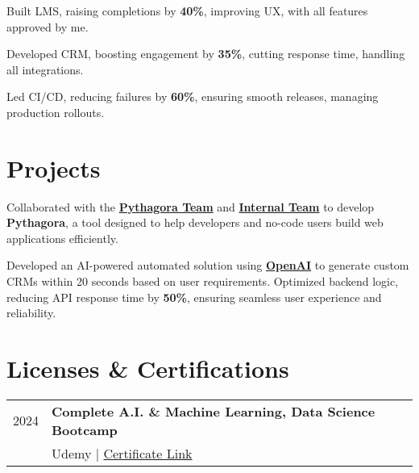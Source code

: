 \documentclass[]{deedy-resume-openfont}
\begin{document}
\begin{minipage}[t]{0.66\textwidth}
    \begin{tightemize}  
        \item Built LMS, raising completions by \textbf{40\%}, improving UX, with all features approved by me.  
        \item Developed CRM, boosting engagement by \textbf{35\%}, cutting response time, handling all integrations.  
        \item Led CI/CD, reducing failures by \textbf{60\%}, ensuring smooth releases, managing production rollouts.  
    \end{tightemize}  
    \sectionsep  
    


    \section{Projects}
    \vspace{0.5em}

    \vspace{0.2em}

    Collaborated with the \textbf{\href{https://pythagora.ai/}{Pythagora Team}} and \textbf{\href{https://www.lnwebworks.com/}{Internal Team}} to develop \textbf{Pythagora}, a tool designed to help developers and no-code users build web applications efficiently.
    \sectionsep

    \vspace{0.2em}  
    
    Developed an AI-powered automated solution using \textbf{\href{http://openai.com/}{OpenAI}} to generate custom CRMs within 20 seconds based on user requirements.  
    Optimized backend logic, reducing API response time by \textbf{50\%}, ensuring seamless user experience and reliability.  
    \sectionsep  
    

    \section{Licenses \& Certifications} 
    \begin{tabular}{rp{8cm}}
        2024 & \textbf{Complete A.I. \& Machine Learning, Data Science Bootcamp} \\
            & Udemy | \href{https://www.udemy.com/certificate/UC-3cbee6e1-4004-4ce4-8835-d999077730fc/}{Certificate Link} \\
        \end{tabular}
    \sectionsep


    \end{minipage} 
    
\end{document}
